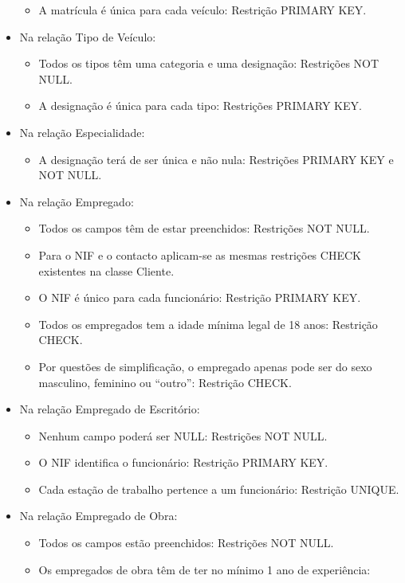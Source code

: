 \documentclass{report}
\begin{document}
\begin{itemize}
\begin{itemize}
				\item A matrícula é única para cada veículo: Restrição PRIMARY KEY.
			\end{itemize}
			\item Na relação Tipo de Veículo:
			\begin{itemize}
				\item Todos os tipos têm uma categoria e uma designação: Restrições NOT NULL.
				\item A designação é única para cada tipo: Restrições PRIMARY KEY.
			\end{itemize}
			\item Na relação Especialidade:
			\begin{itemize}
				\item A designação terá de ser única e não nula: Restrições PRIMARY KEY e NOT 
				NULL.
			\end{itemize}
			\item Na relação Empregado:
			\begin{itemize}
				\item Todos os campos têm de estar preenchidos: Restrições NOT NULL.
				\item Para o NIF e o contacto aplicam-se as mesmas restrições CHECK existentes 
				na classe Cliente.
				\item O NIF é único para cada funcionário: Restrição PRIMARY KEY.
				\item Todos os empregados tem a idade mínima legal de 18 anos: Restrição 
				CHECK.
				\item Por questões de simplificação, o empregado apenas pode ser do sexo 
				masculino, feminino ou “outro”: Restrição CHECK.
			\end{itemize}
			\item Na relação Empregado de Escritório:
			\begin{itemize}
				\item Nenhum campo poderá ser NULL: Restrições NOT NULL.
				\item O NIF identifica o funcionário: Restrição PRIMARY KEY.
				\item Cada estação de trabalho pertence a um funcionário: Restrição UNIQUE.
			\end{itemize}
			\item Na relação Empregado de Obra:
			\begin{itemize}
				\item Todos os campos estão preenchidos: Restrições NOT NULL.
				\item Os empregados de obra têm de ter no mínimo 1 ano de experiência: 

\end{itemize}
\end{itemize}
\end{document}
